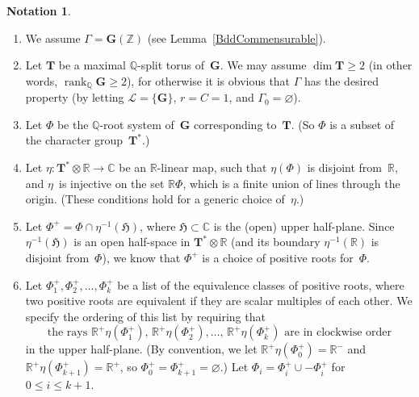 \documentclass[11pt]{article}
\numberwithin{equation}{section}
\newcommand{\CC}{\mathbb{C}}
\newcommand{\QQ}{\mathbb{Q}}
\newcommand{\RR}{\mathbb{R}}
\newcommand{\ZZ}{\mathbb{Z}}
\newcommand{\Ga}{\mathbf{G}}
\newcommand{\Ta}{\mathbf{T}}
\DeclareMathOperator{\rank}{rank}
\newcommand{\hyper}{\mathfrak{H}}
\newcommand{\subgroups}{\mathcal{L}}
\numberwithin{equation}{section}
\theoremstyle{definition}
\newtheorem{notation}[thm]{Notation}
\begin{document}
\begin{notation} \label{QIBddGenNotation}\leavevmode
	\begin{enumerate}\itemsep=0pt
\item %
	We assume $\Gamma = \Ga(\ZZ)$ (see Lemma~\ref{BddCommensurable}).
\item %
	Let $\Ta$ be a maximal $\QQ$-split torus of~$\Ga$. We may assume $\dim \Ta \ge 2$ (in other words, $\rank_\QQ \Ga \ge 2$), for otherwise it is obvious that $\Gamma$ has the desired property (by letting $\subgroups = \{\Ga\}$, $r = C = 1$, and $\Gamma_0 = \varnothing$).
\item Let $\Phi$ be the $\QQ$-root system of~$\Ga$ corresponding to~$\Ta$.
	(So $\Phi$ is a subset of the character group~$\Ta^*$.)
\item Let $\eta \colon \Ta^* \otimes \RR \to \CC$ be an $\RR$-linear map, such that $\eta(\Phi)$ is disjoint from~$\RR$, and $\eta$~is injective on the set $\RR \Phi$, which is a finite union of lines through the origin. (These conditions hold for a generic choice of~$\eta$.)
\item Let $\Phi^+ = \Phi \cap \eta^{-1}(\hyper)$, where $\hyper \subset \CC$ is the (open) upper half-plane.
Since $\eta^{-1}(\hyper)$ is an open half-space in $\Ta^* \otimes \RR$ (and its boundary $\eta^{-1}(\RR)$ is disjoint from~$\Phi$), we know that $\Phi^+$ is a choice of positive roots for~$\Phi$.
\item Let $\Phi^+_1, \Phi^+_2,\ldots,\Phi^+_k$ be a list of the equivalence classes of positive roots, where two positive roots are equivalent if they are scalar multiples of each other. We specify the ordering of this list by requiring that
		\[ \text{the rays $\RR^+ \eta(\Phi^+_1)$, $\RR^+ \eta(\Phi^+_2), \ldots$, $\RR^+ \eta(\Phi^+_k)$ are in clockwise order} \]
	in the upper half-plane.
	(By convention, we let $\RR^+ \eta(\Phi^+_0) = \RR^-$ and $\RR^+ \eta(\Phi^+_{k+1}) = \RR^+$, so $\Phi^+_0 = \Phi^+_{k+1} = \varnothing$.)
	Let $\Phi_i = \Phi^+_i \cup - \Phi^+_i$ for $0 \le i \le k + 1$.
	

\end{enumerate}
\end{notation}
\end{document}
